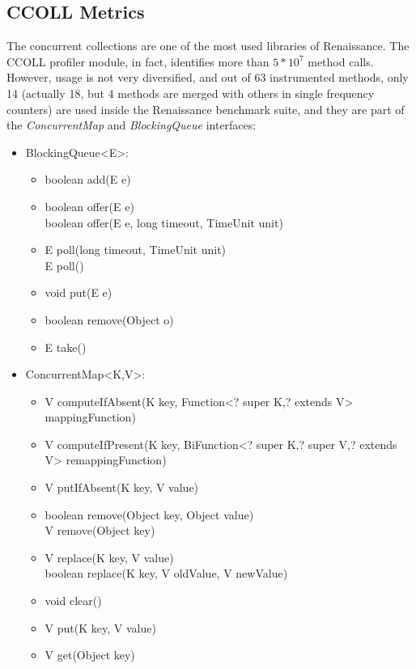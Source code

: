 \documentclass[]{usiinfthesis}
\begin{document}
\subsection{CCOLL Metrics}
The concurrent collections are one of the most used libraries of Renaissance. The CCOLL profiler module, in fact, identifies more than \(5*10^7\) method calls. However, usage is not very diversified, and out of 63 instrumented methods, only 14 (actually 18, but 4 methods are merged with others in single frequency counters) are used inside the Renaissance benchmark suite, and they are part of the \textit{ConcurrentMap} and \textit{BlockingQueue} interfaces:
\begin{itemize}
    \item BlockingQueue<E>:
    \begin{itemize}
        \item boolean add(E e)
        \item boolean offer(E e)
        \mbox{}\\ boolean offer(E e, long timeout, TimeUnit unit)
        \item E poll(long timeout, TimeUnit unit)
        \mbox{}\\ E poll()
        \item void put(E e)
        \item boolean remove(Object o)
        \item E take()
    \end{itemize}
    \item ConcurrentMap<K,V>:
    \begin{itemize}    
    \item   V computeIfAbsent(K key, Function<? super K,? extends V> mappingFunction)
    \item   V computeIfPresent(K key, BiFunction<? super K,? super V,? extends V> remappingFunction)
    \item   V putIfAbsent(K key, V value)
    \item   boolean remove(Object key, Object value)
    \mbox{}\\      V remove(Object key)
    \item   V replace(K key, V value)
    \mbox{}\\      boolean replace(K key, V oldValue, V newValue)
    \item   void clear()
    \item   V put(K key, V value)
    \item   V get(Object key)
    \end{itemize}
\end{itemize}
\end{document}
